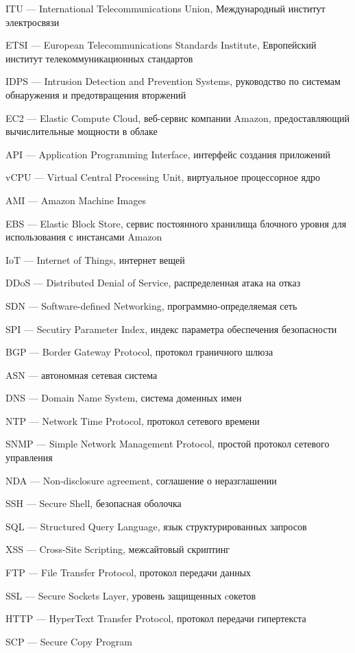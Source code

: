 \hypertarget{itu}{ITU --- International Telecommunications Union, Международный институт электросвязи}

\clearpage

\hypertarget{etsi}{ETSI --- European Telecommunications Standards Institute, Европейский институт телекоммуникационных стандартов}

\hypertarget{idps}{IDPS --- Intrusion Detection and Prevention Systems, руководство по системам обнаружения и предотвращения вторжений}

\hypertarget{ec2}{EC2 --- Elastic Compute Cloud, веб-сервис компании Amazon, предоставляющий вычислительные мощности в облаке}

\hypertarget{api}{API --- Application Programming Interface, интерфейс создания приложений}

\hypertarget{vcpu}{vCPU --- Virtual Central Processing Unit, виртуальное процессорное ядро}

\hypertarget{ami}{AMI --- Amazon Machine Images}

\hypertarget{ebs}{EBS --- Elastic Block Store, сервис постоянного хранилища блочного уровня для использования с инстансами Amazon}

\hypertarget{iot}{IoT --- Internet of Things, интернет вещей}

\hypertarget{ddos}{DDoS --- Distributed Denial of Service, распределенная атака на отказ}

\hypertarget{sdn}{SDN --- Software-defined Networking, программно-определяемая сеть}

\hypertarget{spi}{SPI --- Secutiry Parameter Index, индекс параметра обеспечения безопасности}

\hypertarget{bgp}{BGP --- Border Gateway Protocol, протокол граничного шлюза}

\hypertarget{asn}{ASN --- автономная сетевая система}

\hypertarget{dns}{DNS --- Domain Name System, система доменных имен}

\hypertarget{ntp}{NTP --- Network Time Protocol, протокол сетевого времени}

\hypertarget{snmp}{SNMP --- Simple Network Management Protocol, простой протокол сетевого управления}

\hypertarget{nda}{NDA --- Non-disclosure agreement, соглашение о неразглашении}

\hypertarget{ssh}{SSH --- Secure Shell, безопасная оболочка}

\hypertarget{sql}{SQL --- Structured Query Language, язык структурированных запросов}

\hypertarget{xss}{XSS --- Cross-Site Scripting, межсайтовый скриптинг}

\hypertarget{ftp}{FTP --- File Transfer Protocol, протокол передачи данных}

\hypertarget{ssl}{SSL --- Secure Sockets Layer, уровень защищенных cокетов}

\hypertarget{http}{HTTP --- HyperText Transfer Protocol, протокол передачи гипертекста}

\hypertarget{scp}{SCP --- Secure Copy Program}

\clearpage
